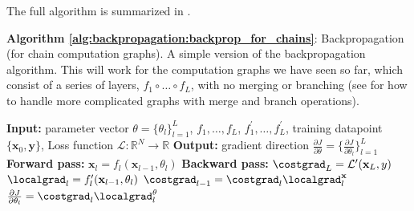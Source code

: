 The full algorithm is summarized in \algref{\ref{alg:backpropagation:backprop_for_chains}}. %

\begin{algorithm}[h]
\SetAlgoVlined
\DontPrintSemicolon
\caption{{\bf Algorithm \ref{alg:backpropagation:backprop_for_chains}}: Backpropagation (for chain computation graphs). A simple version of the backpropagation algorithm. This will work for the computation graphs we have seen so far, which consist of a series of layers, $f_1 \circ \ldots \circ f_L$, with no merging or branching (see \sect{\ref{sec:backpropagation:branch_and_merge}} for how to handle more complicated graphs with merge and branch operations).}
\fakealgorithmcaption{}
\label{alg:backpropagation:backprop_for_chains}
{\bf Input:} parameter vector $\theta = \{\theta_l\}_{l=1}^L$, $f_1, \ldots, f_L$, $f^{\prime}_1, \ldots, f^{\prime}_L$, training datapoint $\{\mathbf{x}_0,\mathbf{y}\}$, Loss function $\mathcal{L}: \mathbb{R}^N \rightarrow \mathbb{R}$\;
{\bf Output:} gradient direction $\frac{\partial J}{\partial \theta} = \Big\{\frac{\partial J}{\partial \theta_l}\Big\}_{l=1}^L$ \;
\;
\textbf{Forward pass:}\;
 {
    $\mathbf{x}_l = f_l(\mathbf{x}_{l-1}, \theta_l)$\;
}
\;
\textbf{Backward pass:}\;
$\costgrad_L = \mathcal{L}^{\prime}(\mathbf{x}_L,y)$\;
 {
    $\localgrad_{l} = f_l^{\prime}(\mathbf{x}_{l-1},\theta_l)$\;
    $\costgrad_{l-1} = \costgrad_{l}\localgrad^{\mathbf{x}}_{l}$\;
    $\frac{\partial J}{\partial \theta_l} = \costgrad_{l}\localgrad^{\theta}_{l}$\;
}
\end{algorithm}


